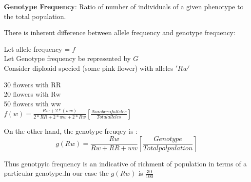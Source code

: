 \documentclass[a4paper]{article}
\begin{document}
\noindent
\textbf{Genotype Frequency}: Ratio of number of individuals of a given phenotype to the total population.

There is inherent difference between allele frequency and genotype frequency:

Let  allele frequency = $f$ \\
Let Genotype frequency be represented by $G$ \\

Consider diploaid specied (some pink flower) with alleles $'Rw'$

30 flowers with RR\\
20 flowers with Rw\\
50 flowers with ww\\

\begin{math}
f(w) = \frac{Rw+2*(ww)}{2*RR+2*ww+2*Rw} [\frac{Number of  alleles}{Total alleles}]
\end{math}

On the other hand, the genotype freuqcy is :\\
\begin{equation}
g(Rw)=\frac{Rw}{Rw+RR+ww}[\frac{Genotype}{Total polpulation}]
\end{equation}

Thus genotpyic frequency is an indicative of richment of population in terms of a particular genotype.In our case
the $g(Rw)$ is $\frac{30}{100}$
\end{document}

